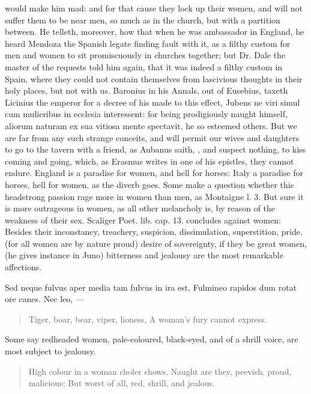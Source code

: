 would make him mad: and for that cause they lock up their women, and
will not suffer them to be near men, so much as in the church,
but with a partition between. He telleth, moreover, how that when he
was ambassador in England, he heard Mendoza the Spanish legate finding
fault with it, as a filthy custom for men and women to sit
promiscuously in churches together; but Dr. Dale the master of the
requests told him again, that it was indeed a filthy custom in Spain,
where they could not contain themselves from lascivious thoughts in
their holy places, but not with us. Baronius in his Annals, out of
Eusebius, taxeth Licinius the emperor for a decree of his made to this
effect, Jubens ne viri simul cum mulieribus in ecclesia interessent:
for being prodigiously naught himself, aliorum naturam ex sua vitiosa
mente spectavit, he so esteemed others. But we are far from any such
strange conceits, and will permit our wives and daughters to go to the
tavern with a friend, as Aubanus saith, , and
suspect nothing, to kiss coming and going, which, as Erasmus writes in
one of his epistles, they cannot endure. England is a paradise for
women, and hell for horses: Italy a paradise for horses, hell for
women, as the diverb goes. Some make a question whether this headstrong
passion rage more in women than men, as Montaigne l. 3. But sure it is
more outrageous in women, as all other melancholy is, by reason of the
weakness of their sex. Scaliger Poet. lib. cap. 13. concludes against
women: Besides their inconstancy, treachery, suspicion,
dissimulation, superstition, pride, (for all women are by nature proud)
desire of sovereignty, if they be great women, (he gives instance in
Juno) bitterness and jealousy are the most remarkable affections.

\begin{latin}%
Sed neque fulvus aper media tam fulvus in ira est,
Fulmineo rapidos dum rotat ore canes.
Nec leo, \etc{}---
\end{latin}%

\begin{verse}%
Tiger, boar, bear, viper, lioness,
A woman's fury cannot express.
\end{verse}%

Some say redheaded women, pale-coloured, black-eyed, and of a
shrill voice, are most subject to jealousy.
%
\begin{verse}%
High colour in a woman choler shows,
Naught are they, peevish, proud, malicious;
But worst of all, red, shrill, and jealous.
\end{verse}%
%

